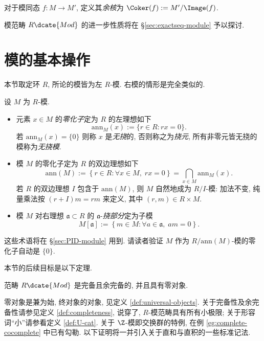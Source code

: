 \begin{definition}\label{def:cokernel}
	对于模同态 $f: M \to M'$, 定义其\emph{余核}为 $\Coker(f) := M'/\Image(f)$.
\end{definition}
模范畴 $R\dcate{Mod}$ 的进一步性质将在 \S\ref{sec:exactseq-module} 予以探讨.

\section{模的基本操作}\label{sec:mod-operations}
本节取定环 $R$, 所论的模皆为左 $R$-模. 右模的情形是完全类似的.

\begin{definition}\label{def:tor-ann}
	设 $M$ 为 $R$-模.
	\begin{itemize}
		\item 元素 $x \in M$ 的\emph{零化子}定为 $R$ 的左理想如下
		\[ \text{ann}_M(x) := \{r \in R : rx=0 \}. \]
		若 $\text{ann}_M(x)=\{0\}$ 则称 $x$ 是\emph{无挠}的, 否则称之为\emph{挠元}, 所有非零元皆无挠的模称为\emph{无挠模}. 
		\item 模 $M$ 的零化子定为 $R$ 的双边理想如下
		\[ \text{ann}(M) := \left\{r \in R: \forall x \in M, \; rx=0 \right\} = \bigcap_{x \in M} \text{ann}_M(x). \]
		若 $R$ 的双边理想 $I$ 包含于 $\text{ann}(M)$, 则 $M$ 自然地成为 $R/I$-模: 加法不变, 纯量乘法按 $(r + I)m = rm$ 来定义, 其中 $(r,m) \in R \times M$.
		\item 模 $M$ 对右理想 $\mathfrak{a} \subset R$ 的 $\mathfrak{a}$-\emph{挠部分}定为子模 
		\[ M[\mathfrak{a}] := \left\{ m \in M: \forall a \in \mathfrak{a}, \; am=0 \right\}. \]
	\end{itemize}
\end{definition}
这些术语将在 \S\ref{sec:PID-module} 用到. 请读者验证 $M$ 作为 $R/\mathrm{ann}(M)$-模的零化子自动是 $\{0\}$.

本节的后续目标是以下定理. 
\begin{theorem}\label{prop:module-cat-completeness}
	范畴 $R\dcate{Mod}$ 是完备且余完备的, 并且具有零对象.
\end{theorem}

零对象是兼为始, 终对象的对象, 见定义 \ref{def:universal-objects}. 关于完备性及余完备性请参见定义 \ref{def:completeness}, 说穿了, $R$-模范畴具有所有小极限; 关于形容词``小''请参看定义 \ref{def:U-cat}. 关于 $\Z$-模即交换群的特例, 在例 \ref{eg:complete-cocomplete} 中已有勾勒. 以下证明将一并引入关于直和与直积的一些标准记法.


